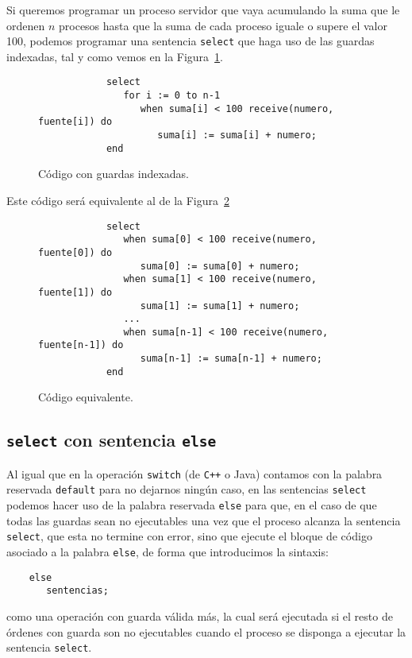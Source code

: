 \begin{ejemplo}
    Si queremos programar un proceso servidor que vaya acumulando la suma que le ordenen $n$ procesos hasta que la suma de cada proceso iguale o supere el valor 100, podemos programar una sentencia \verb|select| que haga uso de las guardas indexadas, tal y como vemos en la Figura~\ref{fig:cod_guardas_indexadas}.
    \begin{figure}[H]
        \centering
        \begin{verbatim}
            select
               for i := 0 to n-1
                  when suma[i] < 100 receive(numero, fuente[i]) do
                     suma[i] := suma[i] + numero;
            end
        \end{verbatim}
        \caption{Código con guardas indexadas.}
        \label{fig:cod_guardas_indexadas}
    \end{figure}
    Este código será equivalente al de la Figura~\ref{fig:cod_guardas_indexadas_equiv}
    \begin{figure}[H]
        \centering
        \begin{verbatim}
            select
               when suma[0] < 100 receive(numero, fuente[0]) do
                  suma[0] := suma[0] + numero;
               when suma[1] < 100 receive(numero, fuente[1]) do
                  suma[1] := suma[1] + numero;
               ...
               when suma[n-1] < 100 receive(numero, fuente[n-1]) do
                  suma[n-1] := suma[n-1] + numero;
            end
        \end{verbatim}
        \caption{Código equivalente.}
        \label{fig:cod_guardas_indexadas_equiv}
    \end{figure}
\end{ejemplo}

\subsection{\texttt{select} con sentencia \texttt{else}}
Al igual que en la operación \verb|switch| (de \verb|C++| o Java) contamos con la palabra reservada \verb|default| para no dejarnos ningún caso, en las sentencias \verb|select| podemos hacer uso de la palabra reservada \verb|else| para que, en el caso de que todas las guardas sean no ejecutables una vez que el proceso alcanza la sentencia \verb|select|, que esta no termine con error, sino que ejecute el bloque de código asociado a la palabra \verb|else|, de forma que introducimos la sintaxis:
\begin{verbatim}
    else
       sentencias;
\end{verbatim}
como una operación con guarda válida más, la cual será ejecutada si el resto de órdenes con guarda son no ejecutables cuando el proceso se disponga a ejecutar la sentencia \verb|select|.

